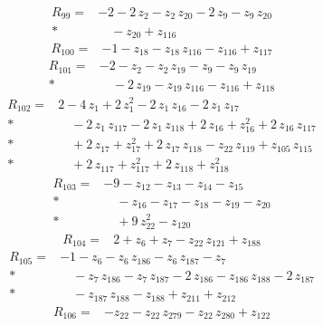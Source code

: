 \documentclass[10pt]{article}
\begin{document}
\begin{align*}
R_{99}={}& - 2 - 2\,z_{2} - z_{2}\,z_{20} - 2\,z_{9} - z_{9}\,z_{20} \\*
&\quad - z_{20} + z_{116}
\end{align*}
\begin{align*}
R_{100}={}& - 1 - z_{18} - z_{18}\,z_{116} - z_{116} + z_{117}
\end{align*}
\begin{align*}
R_{101}={}& - 2 - z_{2} - z_{2}\,z_{19} - z_{9} - z_{9}\,z_{19} \\*
&\quad - 2\,z_{19} - z_{19}\,z_{116} - z_{116} + z_{118}
\end{align*}
\begin{align*}
R_{102}={}& 2 - 4\,z_{1} + 2\,z_{1}^{2} - 2\,z_{1}\,z_{16} - 2\,z_{1}\,z_{17} \\*
&\quad - 2\,z_{1}\,z_{117} - 2\,z_{1}\,z_{118} + 2\,z_{16} + z_{16}^{2} + 2\,z_{16}\,z_{117} \\*
&\quad + 2\,z_{17} + z_{17}^{2} + 2\,z_{17}\,z_{118} - z_{22}\,z_{119} + z_{105}\,z_{115} \\*
&\quad + 2\,z_{117} + z_{117}^{2} + 2\,z_{118} + z_{118}^{2}
\end{align*}
\begin{align*}
R_{103}={}& - 9 - z_{12} - z_{13} - z_{14} - z_{15} \\*
&\quad - z_{16} - z_{17} - z_{18} - z_{19} - z_{20} \\*
&\quad + 9\,z_{22}^{2} - z_{120}
\end{align*}
\begin{align*}
R_{104}={}& 2 + z_{6} + z_{7} - z_{22}\,z_{121} + z_{188}
\end{align*}
\begin{align*}
R_{105}={}& - 1 - z_{6} - z_{6}\,z_{186} - z_{6}\,z_{187} - z_{7} \\*
&\quad - z_{7}\,z_{186} - z_{7}\,z_{187} - 2\,z_{186} - z_{186}\,z_{188} - 2\,z_{187} \\*
&\quad - z_{187}\,z_{188} - z_{188} + z_{211} + z_{212}
\end{align*}
\begin{align*}
R_{106}={}& - z_{22} - z_{22}\,z_{279} - z_{22}\,z_{280} + z_{122}
\end{align*}
\end{document}
